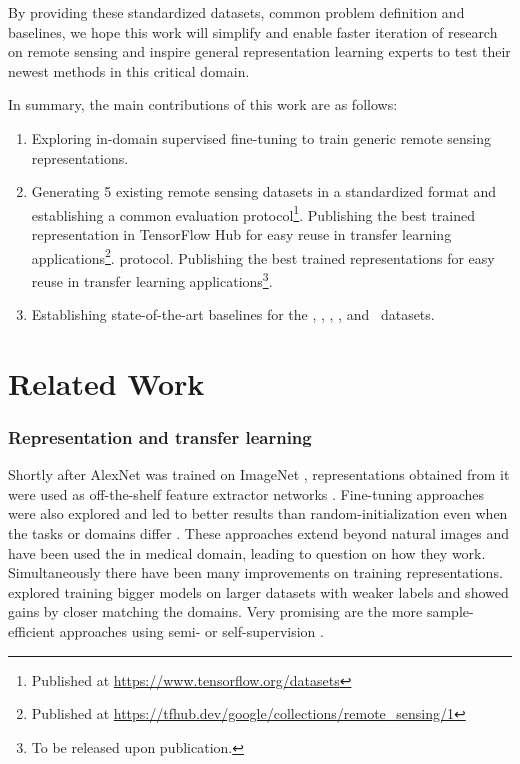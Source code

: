 By providing these standardized datasets, common problem definition and baselines, we hope this work will simplify and enable faster iteration of research on remote sensing and inspire general representation learning experts to test their newest methods in this critical domain.

In summary, the main contributions of this work are as follows:
\begin{enumerate}
    \item Exploring in-domain supervised fine-tuning to train generic remote sensing representations.
    \item Generating 5 existing remote sensing datasets in a standardized format and establishing a common evaluation
    \iffinal
    protocol\footnote{Published at \url{https://www.tensorflow.org/datasets}}.
    Publishing the best trained representation in TensorFlow Hub for easy reuse in transfer learning applications\footnote{Published at \url{https://tfhub.dev/google/collections/remote_sensing/1}}.
    \else
    protocol. Publishing the best trained representations for easy reuse in transfer learning  applications\footnote{To be released upon publication.}.
    \fi
    \item Establishing state-of-the-art baselines for the \ben, \eur, \res, \sos, and \ucm\ datasets.
\end{enumerate}




\section{Related Work}
\subsubsection*{Representation and transfer learning}
Shortly after AlexNet \citep{krizhevsky2012:imagenet} was trained on ImageNet \citep{deng09:imagenet},
representations obtained from it were used as off-the-shelf feature extractor networks \citep{cnn-off-the-shelf}. Fine-tuning approaches were also explored and led to better results than random-initialization even when the tasks or domains differ \citep{how-transferable, kornblith2019:imagenet}. These approaches extend beyond natural images and have been used the in medical domain, leading \citet{raghu2019:transfusion} to question on how they work.
Simultaneously there have been many improvements on training representations. \citet{mahajan2018:weakly-sup} explored training bigger models on larger datasets with weaker labels and \citep{ngiam2018:jft-specialist, cui2018:inaturalist} showed gains by closer matching the domains. Very promising are the more sample-efficient approaches using semi- or self-supervision \citep{zhai2019:S4L}.


